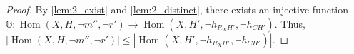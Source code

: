 \begin{proof}
    By \autoref{lem:2_exist} and \autoref{lem:2_distinct}, there exists an injective function $\mathbb{G} : \operatorname{Hom}(X, H, \lnot m'', \lnot r') \to \operatorname{Hom}(X, H', \lnot h_{R_XH'}, \lnot h_{CH'})$. Thus, $|\operatorname{Hom}(X, H, \lnot m'', \lnot r')| \leq |\operatorname{Hom}(X, H', \lnot h_{R_XH'}, \lnot h_{CH'})|$.

\end{proof}  








          

    
